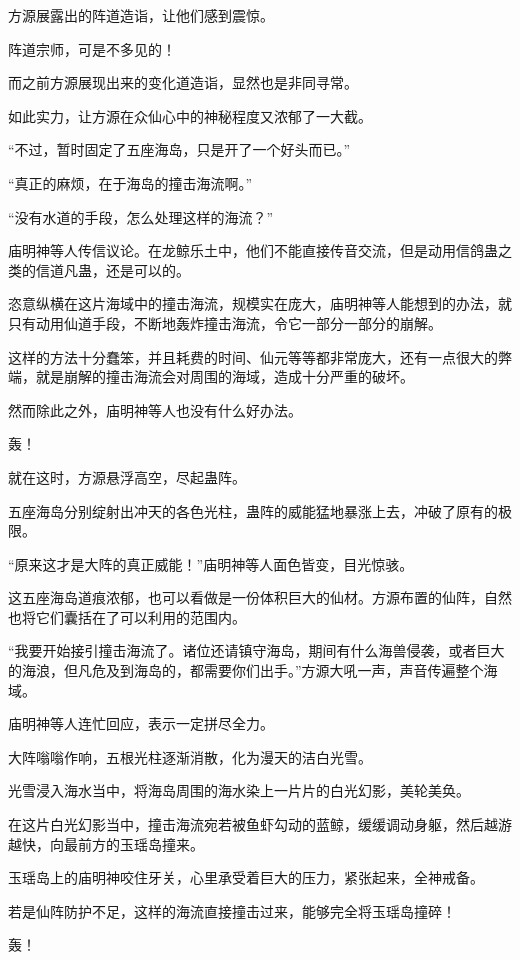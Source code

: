 \begin{this_body}
方源展露出的阵道造诣，让他们感到震惊。

阵道宗师，可是不多见的！

而之前方源展现出来的变化道造诣，显然也是非同寻常。

如此实力，让方源在众仙心中的神秘程度又浓郁了一大截。

“不过，暂时固定了五座海岛，只是开了一个好头而已。”

“真正的麻烦，在于海岛的撞击海流啊。”

“没有水道的手段，怎么处理这样的海流？”

庙明神等人传信议论。在龙鲸乐土中，他们不能直接传音交流，但是动用信鸽蛊之类的信道凡蛊，还是可以的。

恣意纵横在这片海域中的撞击海流，规模实在庞大，庙明神等人能想到的办法，就只有动用仙道手段，不断地轰炸撞击海流，令它一部分一部分的崩解。

这样的方法十分蠢笨，并且耗费的时间、仙元等等都非常庞大，还有一点很大的弊端，就是崩解的撞击海流会对周围的海域，造成十分严重的破坏。

然而除此之外，庙明神等人也没有什么好办法。

轰！

就在这时，方源悬浮高空，尽起蛊阵。

五座海岛分别绽射出冲天的各色光柱，蛊阵的威能猛地暴涨上去，冲破了原有的极限。

“原来这才是大阵的真正威能！”庙明神等人面色皆变，目光惊骇。

这五座海岛道痕浓郁，也可以看做是一份体积巨大的仙材。方源布置的仙阵，自然也将它们囊括在了可以利用的范围内。

“我要开始接引撞击海流了。诸位还请镇守海岛，期间有什么海兽侵袭，或者巨大的海浪，但凡危及到海岛的，都需要你们出手。”方源大吼一声，声音传遍整个海域。

庙明神等人连忙回应，表示一定拼尽全力。

大阵嗡嗡作响，五根光柱逐渐消散，化为漫天的洁白光雪。

光雪浸入海水当中，将海岛周围的海水染上一片片的白光幻影，美轮美奂。

在这片白光幻影当中，撞击海流宛若被鱼虾勾动的蓝鲸，缓缓调动身躯，然后越游越快，向最前方的玉瑶岛撞来。

玉瑶岛上的庙明神咬住牙关，心里承受着巨大的压力，紧张起来，全神戒备。

若是仙阵防护不足，这样的海流直接撞击过来，能够完全将玉瑶岛撞碎！

轰！


\end{this_body}
